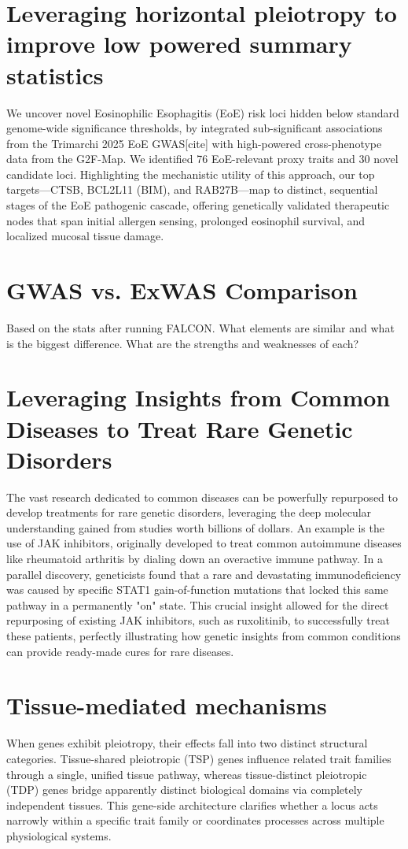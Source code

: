 \section{Leveraging horizontal pleiotropy to improve low powered summary statistics}
\label{sec:horizontal_pleiotropy}
We uncover novel Eosinophilic Esophagitis (EoE) risk loci hidden below standard genome-wide significance thresholds, by integrated sub-significant associations from the Trimarchi 2025 EoE GWAS[cite] with high-powered cross-phenotype data from the G2F-Map. We identified 76 EoE-relevant proxy traits and 30 novel candidate loci. Highlighting the mechanistic utility of this approach, our top targets—CTSB, BCL2L11 (BIM), and RAB27B—map to distinct, sequential stages of the EoE pathogenic cascade, offering genetically validated therapeutic nodes that span initial allergen sensing, prolonged eosinophil survival, and localized mucosal tissue damage.
\section{GWAS vs. ExWAS Comparison}
\label{sec:vs}
Based on the stats after running FALCON. What elements are similar and what is the biggest difference. What are the strengths and weaknesses of each?
\section{Leveraging Insights from Common Diseases to Treat Rare Genetic Disorders}
\label{sec:common_rare}
The vast research dedicated to common diseases can be powerfully repurposed to develop treatments for rare genetic disorders, leveraging the deep molecular understanding gained from studies worth billions of dollars. An example is the use of JAK inhibitors, originally developed to treat common autoimmune diseases like rheumatoid arthritis by dialing down an overactive immune pathway. In a parallel discovery, geneticists found that a rare and devastating immunodeficiency was caused by specific STAT1 gain-of-function mutations that locked this same pathway in a permanently "on" state. This crucial insight allowed for the direct repurposing of existing JAK inhibitors, such as ruxolitinib, to successfully treat these patients, perfectly illustrating how genetic insights from common conditions can provide ready-made cures for rare diseases.
\section{Tissue-mediated mechanisms}
\label{sec:GTT}
When genes exhibit pleiotropy, their effects fall into two distinct structural categories. Tissue-shared pleiotropic (TSP) genes influence related trait families through a single, unified tissue pathway, whereas tissue-distinct pleiotropic (TDP) genes bridge apparently distinct biological domains via completely independent tissues. This gene-side architecture clarifies whether a locus acts narrowly within a specific trait family or coordinates processes across multiple physiological systems.


